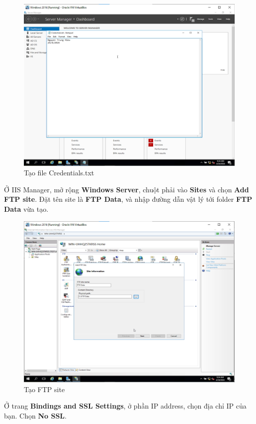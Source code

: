 \begin{figure}[!htb]
    \centering
    \includegraphics[width=0.75\linewidth]{figure//chapter9//lab9_2/create_file.png}
    \caption{Tạo file Credentials.txt}
    \label{fig:enter-label}
\end{figure}

 Ở IIS Manager, mở rộng \textbf{Windows Server}, chuột phải vào \textbf{Sites} và chọn \textbf{Add FTP site}. Đặt tên site là \textbf{FTP Data}, và nhập đường dẫn vật lý tới folder \textbf{FTP Data} vừa tạo.

\begin{figure}[!htb]
    \centering
    \includegraphics[width=0.8\linewidth]{figure//chapter9//lab9_2/create_ftp_site_1.png}
    \caption{Tạo FTP site}
    \label{fig:enter-label}
\end{figure}

 Ở trang \textbf{Bindings and SSL Settings}, ở phần IP address, chọn địa chỉ IP của bạn. Chọn \textbf{No SSL}.

